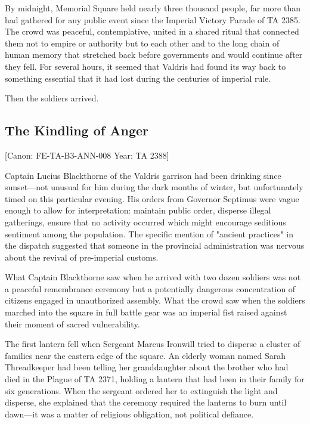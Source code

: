 By midnight, Memorial Square held nearly three thousand people, far more
than had gathered for any public event since the Imperial Victory Parade
of TA 2385. The crowd was peaceful, contemplative, united in a shared
ritual that connected them not to empire or authority but to each other
and to the long chain of human memory that stretched back before
governments and would continue after they fell. For several hours, it
seemed that Valdris had found its way back to something essential that
it had lost during the centuries of imperial rule.

Then the soldiers arrived.

\subsection{The Kindling of Anger}\label{the-kindling-of-anger}

{[}Canon: FE-TA-B3-ANN-008 \textbar{} Year: TA 2388{]}

Captain Lucius Blackthorne of the Valdris garrison had been drinking
since sunset---not unusual for him during the dark months of winter, but
unfortunately timed on this particular evening. His orders from Governor
Septimus were vague enough to allow for interpretation: maintain public
order, disperse illegal gatherings, ensure that no activity occurred
which might encourage seditious sentiment among the population. The
specific mention of "ancient practices" in the dispatch suggested that
someone in the provincial administration was nervous about the revival
of pre-imperial customs.

What Captain Blackthorne saw when he arrived with two dozen soldiers was
not a peaceful remembrance ceremony but a potentially dangerous
concentration of citizens engaged in unauthorized assembly. What the
crowd saw when the soldiers marched into the square in full battle gear
was an imperial fist raised against their moment of sacred
vulnerability.

The first lantern fell when Sergeant Marcus Ironwill tried to disperse a
cluster of families near the eastern edge of the square. An elderly
woman named Sarah Threadkeeper had been telling her granddaughter about
the brother who had died in the Plague of TA 2371, holding a lantern
that had been in their family for six generations. When the sergeant
ordered her to extinguish the light and disperse, she explained that the
ceremony required the lanterns to burn until dawn---it was a matter of
religious obligation, not political defiance.


